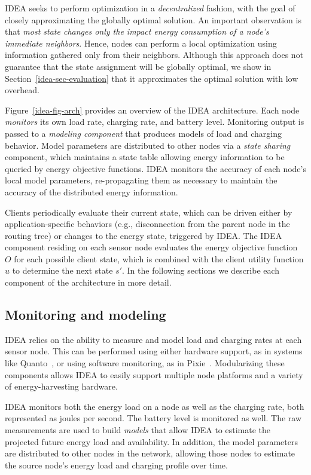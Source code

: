 IDEA seeks to perform optimization in a {\em decentralized} fashion,
with the goal of closely approximating the globally optimal solution. An
important observation is that {\em most state changes only the impact energy
consumption of a node's immediate neighbors}.  Hence, nodes can perform a
local optimization using information gathered only from their neighbors.
Although this approach does not guarantee that the state assignment will be
globally optimal, we show in Section~\ref{idea-sec-evaluation} that it
approximates the optimal solution with low overhead.

Figure~\ref{idea-fig-arch} provides an overview of the IDEA architecture.
Each node {\em monitors} its own load rate, charging rate, and battery level.
Monitoring output is passed to a {\em modeling component} that produces
models of load and charging behavior.  Model parameters are distributed to
other nodes via a {\em state sharing} component, which maintains a state
table allowing energy information to be queried by energy objective
functions. IDEA monitors the accuracy of each node's local model parameters,
re-propagating them as necessary to maintain the accuracy of the distributed
energy information.

Clients periodically evaluate their current state, which can be driven either
by application-specific behaviors (e.g., disconnection from the parent node
in the routing tree) or changes to the energy state, triggered by IDEA. The
IDEA component residing on each sensor node evaluates the energy objective
function $O$ for each possible client state, which is combined with the
client utility function $u$ to determine the next state $s'$. In the
following sections we describe each component of the architecture in more
detail.

\subsection{Monitoring and modeling}

IDEA relies on the ability to measure and model load and charging
rates at each sensor node. This can be performed using either
hardware support, as in systems like Quanto~\cite{quanto-osdi08}, or
using software monitoring, as in Pixie~\cite{pixie-sensys08}. 
Modularizing these components allows IDEA to easily support multiple node
platforms and a variety of energy-harvesting hardware.

IDEA monitors both the energy load on a node as well as the charging rate,
both represented as joules per second. The battery level is monitored as
well. The raw measurements are used to build {\em models} that allow IDEA to
estimate the projected future energy load and availability. In addition, the
model parameters are distributed to other nodes in the network, allowing
those nodes to estimate the source node's energy load and charging profile
over time. 


